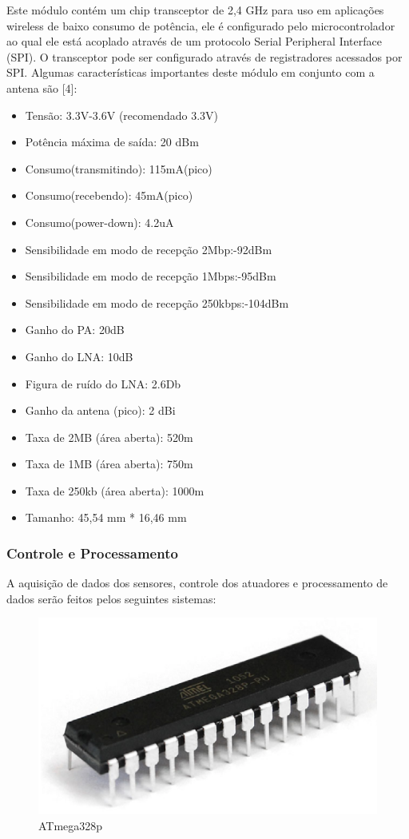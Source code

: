 Este módulo contém um chip transceptor de 2,4 GHz para uso em aplicações wireless de baixo consumo de potência, ele é configurado pelo microcontrolador ao qual ele está acoplado através de um protocolo Serial Peripheral Interface (SPI). O transceptor pode ser  configurado através de registradores acessados por SPI. Algumas características importantes deste módulo em conjunto com a antena são [4]:
\begin{itemize}
\item Tensão: 3.3V-3.6V (recomendado 3.3V)
\item Potência máxima de saída: 20 dBm
\item Consumo(transmitindo): 115mA(pico)
\item Consumo(recebendo): 45mA(pico)
\item Consumo(power-down): 4.2uA
\item Sensibilidade em modo de recepção 2Mbp:-92dBm
\item Sensibilidade em modo de recepção 1Mbps:-95dBm
\item Sensibilidade em modo de recepção 250kbps:-104dBm
\item Ganho do PA: 20dB
\item Ganho do LNA: 10dB
\item Figura de ruído do LNA: 2.6Db
\item Ganho da antena (pico): 2 dBi
\item Taxa de 2MB (área aberta): 520m
\item Taxa de 1MB (área aberta): 750m
\item Taxa de 250kb (área aberta): 1000m
\item Tamanho: 45,54 mm * 16,46 mm
\end{itemize}

\subsubsection{Controle e Processamento}

A aquisição de dados dos sensores, controle dos atuadores e processamento de dados serão feitos pelos seguintes sistemas:


\begin{figure}[H]
 \centering
   \includegraphics[keepaspectratio=true,scale=0.8]{figuras/atmega328.eps}
 \caption{ATmega328p}
 \label{ATmega328p}
\end{figure}

